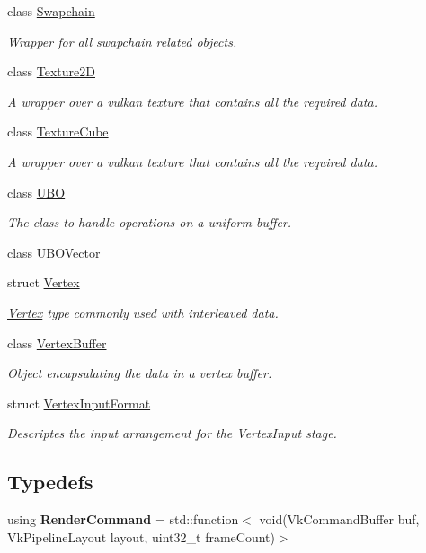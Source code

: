 \begin{DoxyCompactItemize}
class \hyperlink{classblaze_1_1Swapchain}{Swapchain}
\begin{DoxyCompactList}\small\item\em Wrapper for all swapchain related objects. \end{DoxyCompactList}\item 
class \hyperlink{classblaze_1_1Texture2D}{Texture2D}
\begin{DoxyCompactList}\small\item\em A wrapper over a vulkan texture that contains all the required data. \end{DoxyCompactList}\item 
class \hyperlink{classblaze_1_1TextureCube}{Texture\+Cube}
\begin{DoxyCompactList}\small\item\em A wrapper over a vulkan texture that contains all the required data. \end{DoxyCompactList}\item 
class \hyperlink{classblaze_1_1UBO}{U\+BO}
\begin{DoxyCompactList}\small\item\em The class to handle operations on a uniform buffer. \end{DoxyCompactList}\item 
class \hyperlink{classblaze_1_1UBOVector}{U\+B\+O\+Vector}
\item 
struct \hyperlink{structblaze_1_1Vertex}{Vertex}
\begin{DoxyCompactList}\small\item\em \hyperlink{structblaze_1_1Vertex}{Vertex} type commonly used with interleaved data. \end{DoxyCompactList}\item 
class \hyperlink{classblaze_1_1VertexBuffer}{Vertex\+Buffer}
\begin{DoxyCompactList}\small\item\em Object encapsulating the data in a vertex buffer. \end{DoxyCompactList}\item 
struct \hyperlink{structblaze_1_1VertexInputFormat}{Vertex\+Input\+Format}
\begin{DoxyCompactList}\small\item\em Descriptes the input arrangement for the Vertex\+Input stage. \end{DoxyCompactList}\end{DoxyCompactItemize}
\subsection*{Typedefs}
\begin{DoxyCompactItemize}
\item 
\mbox{\label{namespaceblaze_ab6b047a9526c9df1364e5474131c4731}} 
using {\bfseries Render\+Command} = std\+::function$<$ void(Vk\+Command\+Buffer buf, Vk\+Pipeline\+Layout layout, uint32\+\_\+t frame\+Count)$>$
\end{DoxyCompactItemize}
